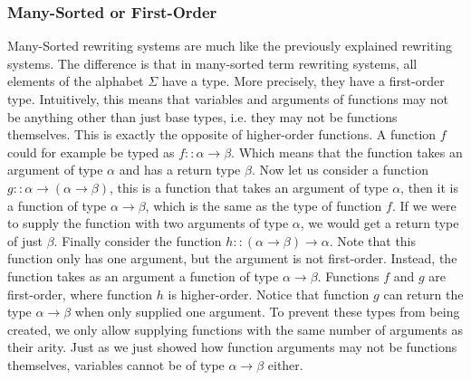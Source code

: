 \subsubsection{Many-Sorted or First-Order}
Many-Sorted rewriting systems are much like the previously explained rewriting systems. The difference is that in many-sorted term rewriting systems, all elements of the alphabet $\Sigma$ have a type. More precisely, they have a first-order type. Intuitively, this means that variables and arguments of functions may not be anything other than just base types, i.e. they may not be functions themselves. \newline
This is exactly the opposite of higher-order functions. A function $f$ could for example be typed as $f :: \alpha \rightarrow \beta$. Which means that the function takes an argument of type $\alpha$ and has a return type $\beta$. Now let us consider a function $g :: \alpha \rightarrow (\alpha \rightarrow \beta)$, this is a function that takes an argument of type $\alpha$, then it is a function of type $\alpha \rightarrow \beta$, which is the same as the type of function $f$. If we were to supply the function with two arguments of type $\alpha$, we would get a return type of just $\beta$. Finally consider the function $h :: (\alpha \rightarrow \beta) \rightarrow \alpha$. Note that this function only has one argument, but the argument is not first-order. Instead, the function takes as an argument a function of type $\alpha \rightarrow \beta$. Functions $f$ and $g$ are first-order, where function $h$ is higher-order. \newline
Notice that function $g$ can return the type $\alpha \rightarrow \beta$ when only supplied one argument. To prevent these types from being created, we only allow supplying functions with the same number of arguments as their arity.\newline
Just as we just showed how function arguments may not be functions themselves, variables cannot be of type $\alpha \rightarrow \beta$ either.
